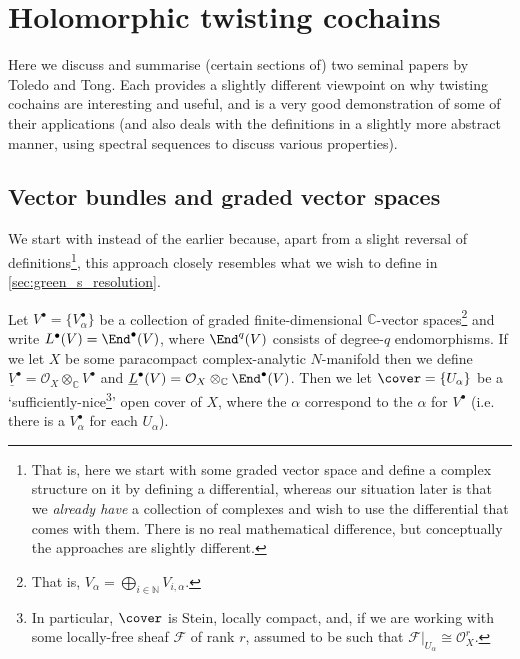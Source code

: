 
\section{Holomorphic twisting cochains}\label{sec:holomorphic-twisting-cochains}

    Here we discuss and summarise (certain sections of) two seminal papers by Toledo and Tong.
    Each provides a slightly different viewpoint on why twisting cochains are interesting and useful, and \cite{OBrian:1981vs} is a very good demonstration of some of their applications (and also deals with the definitions in a slightly more abstract manner, using spectral sequences to discuss various properties).

    \subsection{Vector bundles and graded vector spaces}\label{ssub:vector-bundles-and-graded-vector-spaces}

        We start with \cite{Toledo:1978tq} instead of the earlier \cite{Toledo:1976gy} because, apart from a slight reversal of definitions\footnote{That is, here we start with some graded vector space and define a complex structure on it by defining a differential, whereas our situation later is that we \textit{already have} a collection of complexes and wish to use the differential that comes with them. There is no real mathematical difference, but conceptually the approaches are slightly different.}, this approach closely resembles what we wish to define in \cref{sec:green_s_resolution}.

        \bigskip

        Let $V^\bullet=\{V^\bullet_\alpha\}$ be a collection of graded finite-dimensional $\mathbb{C}$-vector spaces\footnote{That is, $V_\alpha=\bigoplus_{i\in\mathbb{N}}V_{i,\alpha}$.} and write $L^\bullet(V)=\End^\bullet(V)$, where $\End^q(V)$ consists of degree-$q$ endomorphisms.
        If we let $X$ be some paracompact complex-analytic $N$-manifold then we define $\underline{V}^\bullet = \mathcal{O}_X\otimes_\mathbb{C}V^\bullet$ and $\underline{L}^\bullet(V) = \mathcal{O}_X\otimes_\mathbb{C}\End^\bullet(V)$.
        Then we let $\cover=\{U_\alpha\}$ be a `sufficiently-nice\footnote{In particular, $\cover$ is Stein, locally compact, and, if we are working with some locally-free sheaf $\mathcal{F}$ of rank $r$, assumed to be such that $\mathcal{F}|_{U_\alpha}\cong\mathcal{O}_X^r$.}' open cover of $X$, where the $\alpha$ correspond to the $\alpha$ for $V^\bullet$ (i.e. there is a $V^\bullet_\alpha$ for each $U_\alpha$).

